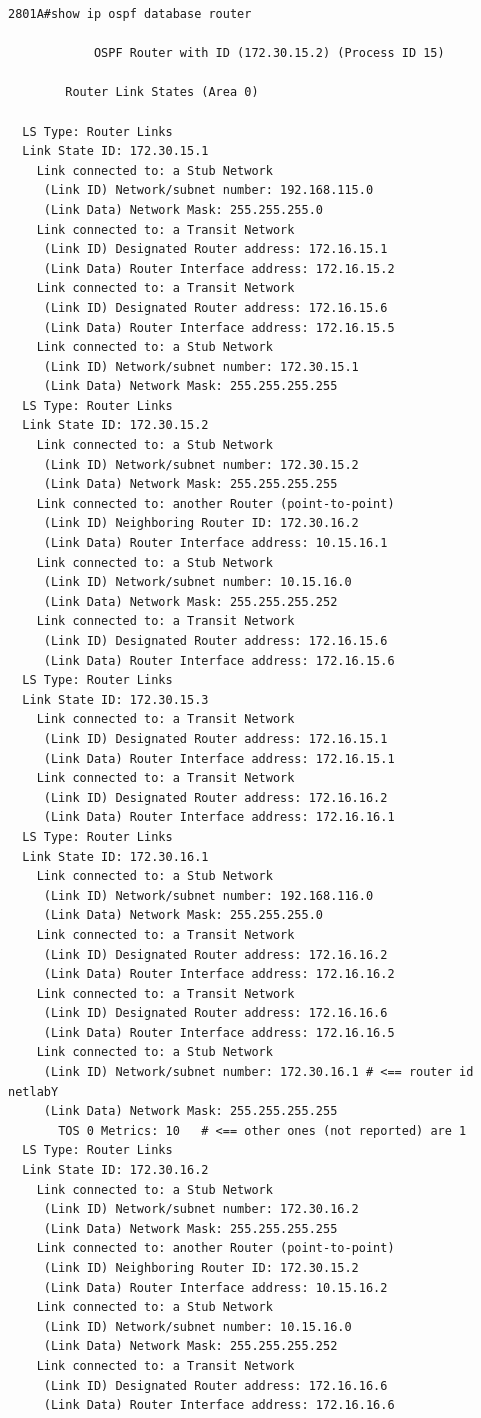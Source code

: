 \documentclass{llncs}
\begin{document}
\begin{lstlisting}
2801A#show ip ospf database router 

            OSPF Router with ID (172.30.15.2) (Process ID 15)

		Router Link States (Area 0)
		
  LS Type: Router Links
  Link State ID: 172.30.15.1
    Link connected to: a Stub Network
     (Link ID) Network/subnet number: 192.168.115.0
     (Link Data) Network Mask: 255.255.255.0
    Link connected to: a Transit Network
     (Link ID) Designated Router address: 172.16.15.1
     (Link Data) Router Interface address: 172.16.15.2
    Link connected to: a Transit Network
     (Link ID) Designated Router address: 172.16.15.6
     (Link Data) Router Interface address: 172.16.15.5
    Link connected to: a Stub Network
     (Link ID) Network/subnet number: 172.30.15.1
     (Link Data) Network Mask: 255.255.255.255
  LS Type: Router Links
  Link State ID: 172.30.15.2
    Link connected to: a Stub Network
     (Link ID) Network/subnet number: 172.30.15.2
     (Link Data) Network Mask: 255.255.255.255
    Link connected to: another Router (point-to-point)
     (Link ID) Neighboring Router ID: 172.30.16.2
     (Link Data) Router Interface address: 10.15.16.1
    Link connected to: a Stub Network
     (Link ID) Network/subnet number: 10.15.16.0
     (Link Data) Network Mask: 255.255.255.252
    Link connected to: a Transit Network
     (Link ID) Designated Router address: 172.16.15.6
     (Link Data) Router Interface address: 172.16.15.6  
  LS Type: Router Links
  Link State ID: 172.30.15.3
    Link connected to: a Transit Network
     (Link ID) Designated Router address: 172.16.15.1
     (Link Data) Router Interface address: 172.16.15.1
    Link connected to: a Transit Network
     (Link ID) Designated Router address: 172.16.16.2
     (Link Data) Router Interface address: 172.16.16.1
  LS Type: Router Links
  Link State ID: 172.30.16.1
    Link connected to: a Stub Network
     (Link ID) Network/subnet number: 192.168.116.0
     (Link Data) Network Mask: 255.255.255.0   
    Link connected to: a Transit Network
     (Link ID) Designated Router address: 172.16.16.2
     (Link Data) Router Interface address: 172.16.16.2
    Link connected to: a Transit Network
     (Link ID) Designated Router address: 172.16.16.6
     (Link Data) Router Interface address: 172.16.16.5
    Link connected to: a Stub Network
     (Link ID) Network/subnet number: 172.30.16.1 # <== router id netlabY
     (Link Data) Network Mask: 255.255.255.255
       TOS 0 Metrics: 10   # <== other ones (not reported) are 1
  LS Type: Router Links
  Link State ID: 172.30.16.2
    Link connected to: a Stub Network
     (Link ID) Network/subnet number: 172.30.16.2
     (Link Data) Network Mask: 255.255.255.255
    Link connected to: another Router (point-to-point)
     (Link ID) Neighboring Router ID: 172.30.15.2
     (Link Data) Router Interface address: 10.15.16.2
    Link connected to: a Stub Network
     (Link ID) Network/subnet number: 10.15.16.0
     (Link Data) Network Mask: 255.255.255.252
    Link connected to: a Transit Network
     (Link ID) Designated Router address: 172.16.16.6
     (Link Data) Router Interface address: 172.16.16.6
\end{lstlisting}
\end{document}

